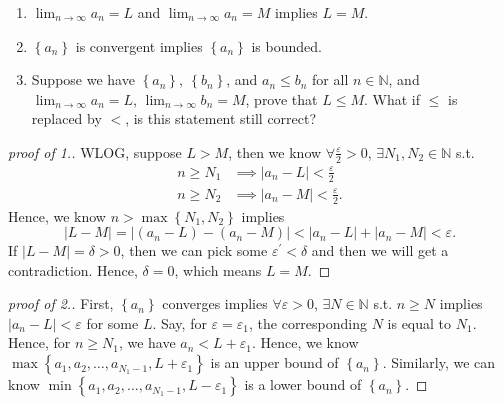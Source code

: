 \begin{exercise}
\begin{enumerate}	
	\item 	\(\lim_{n \to \infty} a_n = L \) and \(\lim_{n \to \infty} a_n = M\) implies \(L=M\).  
	\item \(\left\{ a_n \right\} \) is convergent implies \(\left\{ a_n \right\} \) is bounded.  
	\item Suppose we have \(\left\{ a_n \right\}, \ \left\{ b_n \right\}  \), and \(a_n \le b_n\) for all \(n \in \mathbb{N} \), and \(\lim_{n \to \infty} a_n = L \), \(\lim_{n \to \infty} b_n = M \), prove that \(L \le M\). What if \(\le\) is replaced by \(<\), is this statement still correct?  
\end{enumerate} 
\end{exercise}
\begin{proof}[proof of 1.]
WLOG, suppose \(L > M\), then we know \(\forall \frac{\varepsilon}{2} > 0\), \(\exists N_1, N_2 \in \mathbb{N} \) s.t. 
\begin{align*}
	n \geq  N_1 &\implies \left\vert a_n - L \right\vert < \frac{\varepsilon}{2} \\
	n \geq  N_2 &\implies \left\vert a_n - M \right\vert < \frac{\varepsilon}{2}.
\end{align*}   
Hence, we know \(n > \max \left\{ N_1, N_2 \right\} \) implies 
\[
	\left\vert L - M \right\vert = \left\vert \left( a_n - L \right) - \left( a_n - M \right)  \right\vert < \left\vert a_n - L \right\vert + \left\vert a_n - M \right\vert < \varepsilon.   
\]
If \(\left\vert L - M \right\vert = \delta >0 \), then we can pick some \(\varepsilon ^{\prime} < \delta \) and then we will get a contradiction. Hence, \(\delta = 0\), which means \(L=M\).    
\end{proof}
\begin{proof}[proof of 2.]
	First, \(\left\{ a_n \right\} \) converges implies \(\forall \varepsilon > 0\), \(\exists N \in \mathbb{N} \) s.t. \(n \ge N\) implies \(\left\vert a_n - L \right\vert < \varepsilon \) for some \(L\). Say, for \(\varepsilon = \varepsilon _1\), the corresponding \(N\) is equal to \(N_1\). Hence, for \(n \ge N_1\), we have \(a_n < L + \varepsilon _1\). Hence, we know \(\max \left\{ a_1, a_2, \dots , a_{N_1 - 1}, L + \varepsilon _1 \right\} \) is an upper bound of \(\left\{ a_n \right\} \). Similarly, we can know \(\min \left\{ a_1, a_2, \dots , a_{N_1 - 1}, L - \varepsilon _1 \right\} \) is a lower bound of \(\left\{ a_n \right\} \).              
\end{proof}
